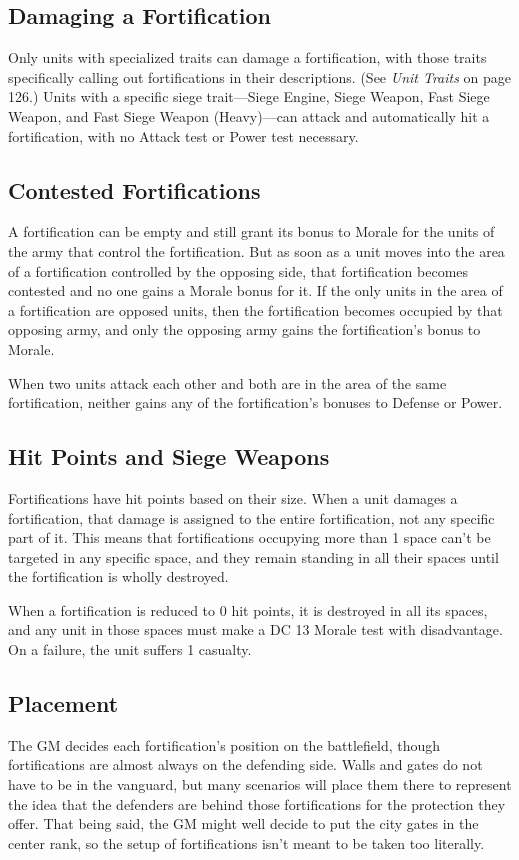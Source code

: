 \documentclass[10pt,a4paper,twoside,bg=print,twocolumn,openany,nodeprecatedcode]{dndbook}
\begin{document}
\subsection{Damaging a Fortification}
Only units with specialized traits can damage a fortification, with those traits specifically calling out fortifications in their descriptions. (See \textit{Unit Traits} on page 126.) Units with a specific siege trait—Siege Engine, Siege Weapon, Fast Siege Weapon, and Fast Siege Weapon (Heavy)—can attack and automatically hit a fortification, with no Attack test or Power test necessary.

\subsection{Contested Fortifications}
A fortification can be empty and still grant its bonus to Morale for the units of the army that control the fortification. But as soon as a unit moves into the area of a fortification controlled by the opposing side, that fortification becomes contested and no one gains a Morale bonus for it. If the only units in the area of a fortification are opposed units, then the fortification becomes occupied by that opposing army, and only the opposing army gains the fortification's bonus to Morale.

When two units attack each other and both are in the area of the same fortification, neither gains any of the fortification's bonuses to Defense or Power.

\subsection{Hit Points and Siege Weapons}
Fortifications have hit points based on their size. When a unit damages a fortification, that damage is assigned to the entire fortification, not any specific part of it. This means that fortifications occupying more than 1 space can't be targeted in any specific space, and they remain standing in all their spaces until the fortification is wholly destroyed.

When a fortification is reduced to 0 hit points, it is destroyed in all its spaces, and any unit in those spaces must make a DC 13 Morale test with disadvantage. On a failure, the unit suffers 1 casualty.

\subsection{Placement}
The GM decides each fortification's position on the battlefield, though fortifications are almost always on the defending side. Walls and gates do not have to be in the vanguard, but many scenarios will place them there to represent the idea that the defenders are behind those fortifications for the protection they offer. That being said, the GM might well decide to put the city gates in the center rank, so the setup of fortifications isn't meant to be taken too literally.
\end{document}
